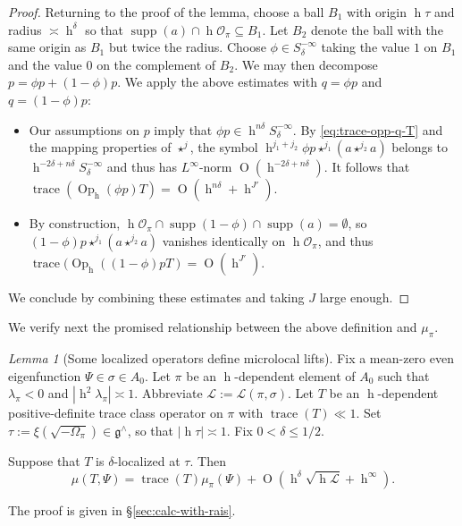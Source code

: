 \documentclass[reqno,10pt]{amsart}
\theoremstyle{plain} %
\theoremstyle{definition}
\theoremstyle{plain} %
\theoremstyle{remark}
\theoremstyle{itplain} %
\newtheorem{lemma}{Lemma}
\theoremstyle{remark} %
\renewcommand{\leq}{\leqslant}
\numberwithin{equation}{section}
\DeclareMathOperator{\trace}{trace}
\def\O{\operatorname{O}}
\DeclareMathOperator{\Opp}{Op}
\DeclareMathOperator{\supp}{supp}
\DeclareMathOperator{\h}{h}
\begin{document}
\begin{proof}
  Returning to the proof of the lemma, choose a ball $B_1$ with origin $\h \tau$ and radius $\asymp \h^\delta$ so that $\supp(a) \cap \h \mathcal{O}_\pi \subseteq B_1$.  Let $B_2$ denote the ball with the same origin as $B_1$ but twice the radius.  Choose $\phi \in S^{-\infty}_{\delta}$ taking the value $1$ on $B_1$ and the value $0$ on the complement of $B_2$.  We may then decompose $p = \phi p + (1 - \phi) p$.  We apply the above estimates with $q =\phi p$ and $q = (1 - \phi) p$:
  \begin{itemize}
  \item Our assumptions on $p$ imply that $\phi p \in \h^{n \delta} S^{-\infty}_\delta$.  By \eqref{eq:trace-opp-q-T} and the mapping properties of $\star^j$, the symbol $\h^{j_1 + j_2} \phi p \star^{j_1} (a \star^{j_2} a)$ belongs to $\h^{-2 \delta + n \delta} S^{-\infty}_\delta$ and thus has $L^\infty$-norm $\O(\h^{- 2 \delta + n \delta})$.  It follows that $\trace(\Opp_{\h}(\phi p) T) = \O(\h^{n \delta} + \h^{J'})$.
  \item By construction, $\h \mathcal{O}_\pi \cap \supp(1-\phi) \cap \supp(a) = \emptyset$, so $(1 - \phi) p \star^{j_1} (a \star^{j_2} a)$ vanishes identically on $\h \mathcal{O}_\pi$, and thus $\trace(\Opp_{\h}((1-\phi) p T) = \O(\h^{J'})$.
  \end{itemize}
  We conclude by combining these estimates and taking $J$ large enough.
\end{proof}

We verify next the promised relationship between the above definition and $\mu_\pi$.
\begin{lemma}[Some localized operators define microlocal lifts]\label{thm:characterize-mu-pi}
  Fix a mean-zero even eigenfunction $\Psi \in \sigma \in A_0$.  Let $\pi$ be an $\h$-dependent element of $A_0$ such that $\lambda_\pi < 0$ and $|\h^2 \lambda_\pi| \asymp 1$.  Abbreviate $\mathcal{L} := \mathcal{L}(\pi,\sigma)$.  Let $T$ be an $\h$-dependent positive-definite trace class operator on $\pi$ with $\trace(T) \ll 1$.  Set $\tau := \xi(\sqrt{-\Omega_\pi}) \in \mathfrak{g}^\wedge$, so that $|\h \tau| \asymp 1$.  Fix $0 < \delta \leq 1/2$.

  Suppose that $T$ is $\delta$-localized at $\tau$.  Then
  \begin{equation}\label{eq:mu-T-Psi-approximates-etc}
    \mu(T,\Psi)
    =
    \trace(T)
    \mu_\pi(\Psi)
    + \O (\h^\delta \sqrt{\h \mathcal{L} } + \h^\infty ).
  \end{equation}
\end{lemma}
The proof is given in \S\ref{sec:calc-with-rais}.
\end{document}
